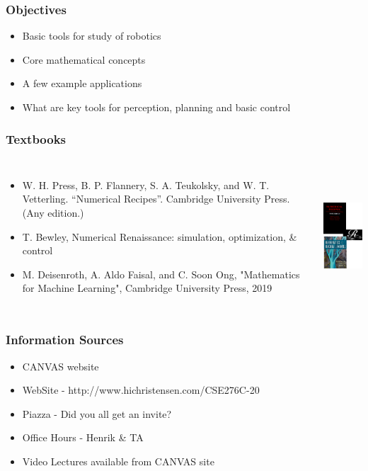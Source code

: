 \documentclass[10pt]{beamer}
\begin{document}
\begin{frame}
  \frametitle{Objectives}
  \begin{itemize}
  \item Basic tools for study of robotics
  \item Core mathematical concepts
  \item A few example applications
  \item What are key tools for perception, planning and basic control
  \end{itemize}
\end{frame}

\begin{frame}
  \frametitle{Textbooks}
  \begin{columns}
    \column{7cm}
    \begin{itemize}
    \item W. H. Press, B. P. Flannery, S. A. Teukolsky, and W. T. Vetterling. ``Numerical Recipes''. Cambridge University Press. (Any edition.)
    \item T. Bewley, Numerical Renaissance: simulation, optimization, \& control
    \item M. Deisenroth, A. Aldo Faisal, and C. Soon Ong, "Mathematics for Machine Learning", Cambridge University Press, 2019
    \end{itemize}
    \column{3cm}
    \begin{center}
      \includegraphics[height=5cm]{books}
    \end{center}
  \end{columns}
\end{frame}

\begin{frame}
  \frametitle{Information Sources}
  \begin{itemize}
  \item CANVAS website
  \item WebSite - http://www.hichristensen.com/CSE276C-20
  \item Piazza - Did you all get an invite?
  \item Office Hours - Henrik \& TA 
  \item Video Lectures available from CANVAS site
  \end{itemize}
\end{frame}
\end{document}
